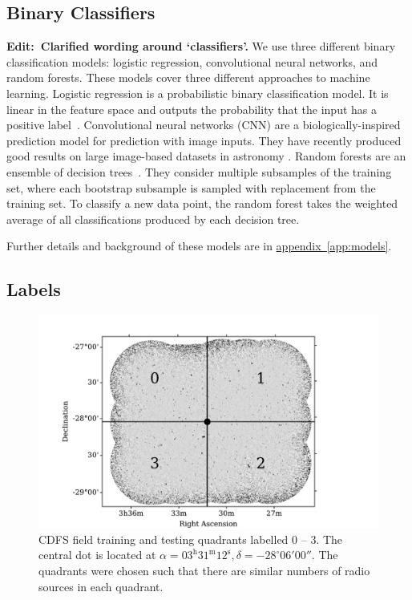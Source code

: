 \documentclass[fleqn,usenatbib,usedcolumn]{mnras}
\newcommand{\edit}[1]{{\bf Edit:~{#1}}}
\newcommand{\aref}[1]{\hyperref[#1]{appendix~\ref{#1}}}
\begin{document}
  \subsection{Binary Classifiers}\label{sec:classifiers}

    \edit{Clarified wording around `classifiers'.} We use three different binary classification models: logistic regression, convolutional neural networks, and random forests. These models cover three different approaches to machine learning. Logistic regression is a probabilistic binary classification model. It is linear in the feature space and outputs the probability that the input has a positive label~\citep[Chap. 4]{bishop06ml}. Convolutional neural networks (CNN) are a biologically-inspired prediction model for prediction with image inputs. They have recently produced good results on large image-based datasets in astronomy \citep[e.g.][Lukic et al. in press]{dieleman15cnn}. Random forests are an ensemble of decision trees~\citep{breiman01random-forest}. They consider multiple subsamples of the training set, where each bootstrap subsample is sampled with replacement from the training set. To classify a new data point, the random forest takes the weighted average of all classifications produced by each decision tree.

    Further details and background of these models are in \aref{app:models}.

  \subsection{Labels}\label{sec:labels}
    \begin{figure}
      \centering
      \includegraphics[width=\columnwidth]{images/quadrants.pdf}
      \caption{CDFS field training and testing quadrants labelled 0 -- 3. The
        central dot is located at $\alpha = 03^\text{h}31^\text{m}12^\text{s},
        \delta = -28^\circ{}06'00''$. The quadrants were chosen such that
        there are similar numbers of radio sources in each
        quadrant.\label{fig:quadrants}}
    \end{figure}
\end{document}
